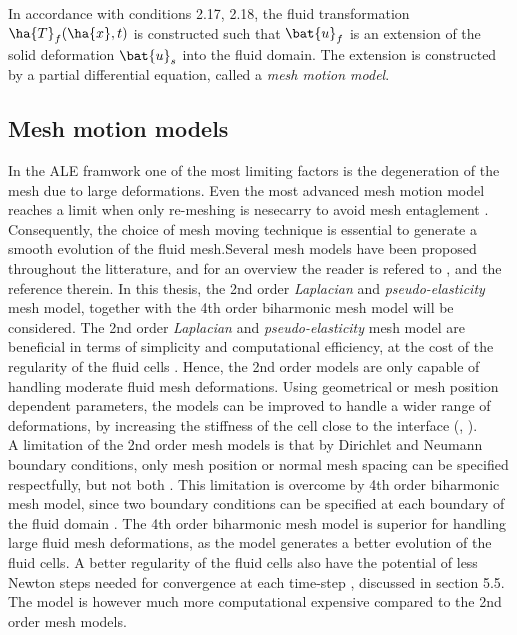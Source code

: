 In accordance with conditions 2.17, 2.18, the fluid transformation $\ha{T}_f(\ha{x}, t) $ is constructed such that $\bat{u}_f$ is an extension of the solid deformation $\bat{u}_s$ into the fluid domain. The extension is constructed by a partial differential equation, called a \textit{mesh motion model}. 

\subsection{Mesh motion models}

In the ALE framwork one of the most limiting factors is the degeneration of the mesh due to large deformations. Even the most advanced mesh motion model  reaches a limit when only re-meshing is nesecarry to avoid mesh entaglement \cite{Wall12006}. Consequently, the choice of  mesh moving technique is essential to generate a smooth evolution of the fluid mesh.Several mesh models have been proposed throughout the litterature, and for an overview the reader is refered to \cite{MM2016}, and the reference therein. 
In this thesis, the 2nd order \textit{Laplacian} and \textit{pseudo-elasticity} mesh model, together with the 4th order biharmonic mesh model will be considered.  The 2nd order \textit{Laplacian} and \textit{pseudo-elasticity} mesh model are beneficial in terms of simplicity and computational efficiency, at the cost of the  regularity of the fluid cells  \cite{Wick2011}. Hence, the 2nd order models are only capable of handling moderate fluid mesh deformations. Using geometrical or mesh position dependent parameters, the models can be improved to handle a wider range of deformations, by increasing the stiffness of the cell close to the interface (\cite{Hsu}, \cite{Dwight}). \\
A limitation of the 2nd order mesh models is that by Dirichlet and Neumann boundary conditions, only mesh position or normal mesh spacing can be specified respectfully, but not both  \cite{Helenbrook2003}. This limitation is overcome by 4th order biharmonic mesh model, since two boundary conditions can be specified at each boundary of the fluid domain \cite{Helenbrook2003}. The 4th order biharmonic mesh model is superior for  handling large  fluid mesh deformations, as the model generates a better evolution of the fluid cells. A better regularity of the fluid cells also have the potential of less Newton steps needed for convergence at each time-step \cite{Wick2011}, discussed in section 5.5. The model is however much more computational expensive compared to the 2nd order mesh models. 


